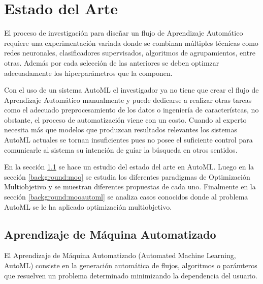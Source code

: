 \chapter{Estado del Arte}\label{chapter:state-of-the-art}
El proceso de investigaci\'on para dise\~nar un flujo de Aprendizaje Autom\'atico requiere una experimentaci\'on variada donde se combinan m\'ultiples t\'ecnicas como redes neuronales, clasificadores supervisados, algoritmos de agrupamientos, entre otras. Adem\'as por cada selecci\'on de las anteriores se deben optimzar adecuadamente los hiperpar\'ametros que la componen.

Con el uso de un sistema AutoML el investigador ya no tiene que crear el flujo de Aprendizaje Autom\'atico manualmente y puede dedicarse a realizar otras tareas como el adecuado preprocesamiento de los datos o ingenier\'ia de caracter\'istcas, no obstante, el proceso de automatizaci\'on viene con un costo. Cuando al experto necesita m\'as que modelos que produzcan resultados relevantes los sistemas AutoML actuales se tornan insuficientes pues no posee el suficiente control para comunicarle al sistema su intenci\'on de gu\'iar la b\'usqueda en otros sentidos.

En la secci\'on \ref{background:automl} se  hace un estudio del estado del arte en AutoML. Luego en la secci\'on \ref{background:moo} se estudia los diferentes paradigmas de Optimizaci\'on Multiobjetivo y se muestran diferentes propuestas de cada uno. Finalmente en la secci\'on \ref{background:mooautoml} se analiza casos conocidos donde al problema AutoML se le ha aplicado optimizaci\'on multiobjetivo.

\section{Aprendizaje de M\'aquina Automatizado}\label{background:automl}
El Aprendizaje de M\'aquina Automatizado (Automated Machine Learning, AutoML) consiste en la generaci\'on autom\'atica de flujos, algoritmos o par\'amteros que resuelven un problema determinado minimizando la dependencia del usuario. 

